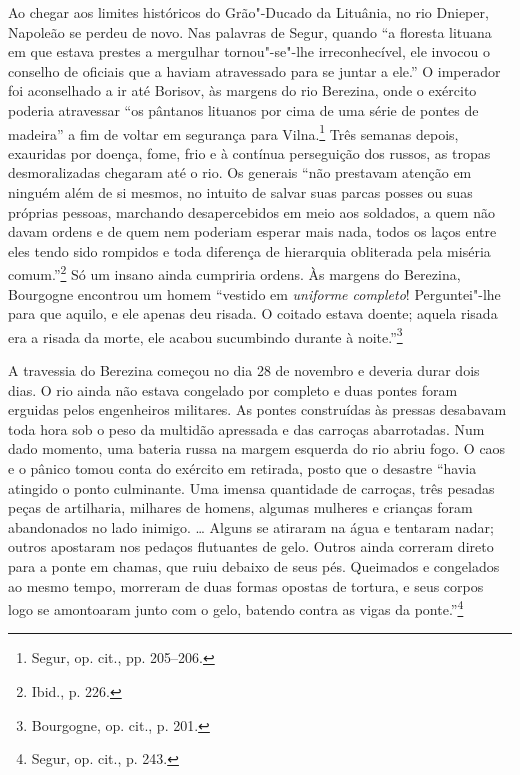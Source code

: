 Ao chegar aos limites históricos do Grão"-Ducado da Lituânia, no rio
Dnieper, Napoleão se perdeu de novo. Nas palavras de Segur, quando ``a
floresta lituana em que estava prestes a mergulhar tornou"-se"-lhe
irreconhecível, ele invocou o conselho de oficiais que a haviam
atravessado para se juntar a ele.'' O imperador foi aconselhado a ir até
Borisov, às margens do rio Berezina, onde o exército poderia atravessar
``os pântanos lituanos por cima de uma série de pontes de madeira'' a
fim de voltar em segurança para Vilna.\footnote{Segur, op. cit., pp.
  205--206.} Três semanas depois, exauridas por doença, fome, frio e à
contínua perseguição dos russos, as tropas desmoralizadas chegaram até o
rio. Os generais ``não prestavam atenção em ninguém além de si mesmos,
no intuito de salvar suas parcas posses ou suas próprias pessoas,
marchando desapercebidos em meio aos soldados, a quem não davam ordens e
de quem nem poderiam esperar mais nada, todos os laços entre eles tendo
sido rompidos e toda diferença de hierarquia obliterada pela miséria
comum.''\footnote{Ibid., p. 226.} Só um insano ainda cumpriria ordens.
Às margens do Berezina, Bourgogne encontrou um homem ``vestido em
\emph{uniforme completo}! Perguntei"-lhe para que aquilo, e ele apenas
deu risada. O coitado estava doente; aquela risada era a risada da
morte, ele acabou sucumbindo durante à noite.''\footnote{Bourgogne, op.
  cit., p. 201.}

A travessia do Berezina começou no dia 28 de novembro e deveria durar
dois dias. O rio ainda não estava congelado por completo e duas pontes
foram erguidas pelos engenheiros militares. As pontes construídas às
pressas desabavam toda hora sob o peso da multidão apressada e das
carroças abarrotadas. Num dado momento, uma bateria russa na margem
esquerda do rio abriu fogo. O caos e o pânico tomou conta do exército em
retirada, posto que o desastre ``havia atingido o ponto culminante. Uma
imensa quantidade de carroças, três pesadas peças de artilharia,
milhares de homens, algumas mulheres e crianças foram abandonados no
lado inimigo. \ldots{} Alguns se atiraram na água e tentaram nadar;
outros apostaram nos pedaços flutuantes de gelo. Outros ainda correram
direto para a ponte em chamas, que ruiu debaixo de seus pés. Queimados e
congelados ao mesmo tempo, morreram de duas formas opostas de tortura, e
seus corpos logo se amontoaram junto com o gelo, batendo contra as vigas
da ponte.''\footnote{Segur, op. cit., p. 243.}

